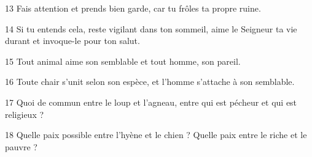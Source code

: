 
13 Fais attention et prends bien garde, car tu frôles ta propre ruine.

14 Si tu entends cela, reste vigilant dans ton sommeil, aime le Seigneur ta vie durant et invoque-le pour ton salut.

15 Tout animal aime son semblable et tout homme, son pareil.

16 Toute chair s’unit selon son espèce, et l’homme s’attache à son semblable.

17 Quoi de commun entre le loup et l’agneau, entre qui est pécheur et qui est religieux ?

18 Quelle paix possible entre l’hyène et le chien ? Quelle paix entre le riche et le pauvre ?